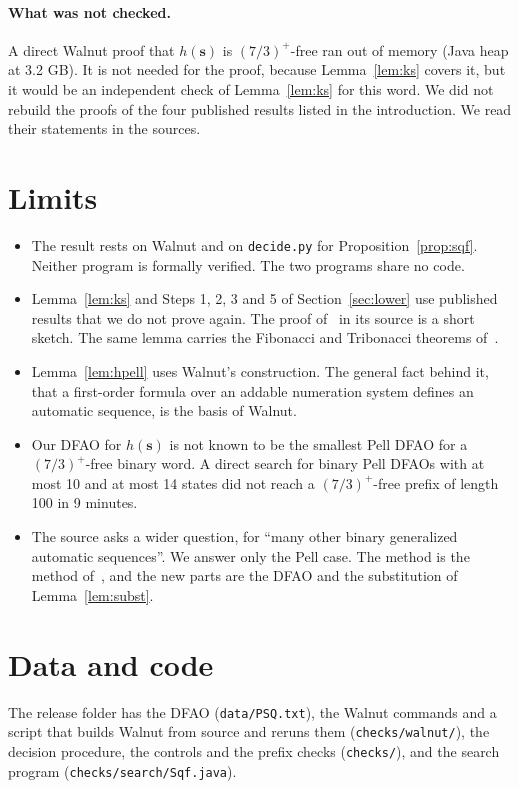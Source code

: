\documentclass[11pt]{article}
\theoremstyle{definition}
\theoremstyle{remark}
\newcommand{\PSQ}{\mathbf{s}}
\begin{document}
\paragraph{What was not checked.} A direct Walnut proof that $h(\PSQ)$ is $(7/3)^+$-free ran out of memory (Java heap at 3.2 GB). It is not needed for the proof, because Lemma~\ref{lem:ks} covers it, but it would be an independent check of Lemma~\ref{lem:ks} for this word. We did not rebuild the proofs of the four published results listed in the introduction. We read their statements in the sources.

\section{Limits}

\begin{itemize}
\item The result rests on Walnut and on \texttt{decide.py} for Proposition~\ref{prop:sqf}. Neither program is formally verified. The two programs share no code.
\item Lemma~\ref{lem:ks} and Steps 1, 2, 3 and 5 of Section~\ref{sec:lower} use published results that we do not prove again. The proof of~\cite[Lemma~10]{ARS} in its source is a short sketch. The same lemma carries the Fibonacci and Tribonacci theorems of~\cite{ARS}.
\item Lemma~\ref{lem:hpell} uses Walnut's construction. The general fact behind it, that a first-order formula over an addable numeration system defines an automatic sequence, is the basis of Walnut.
\item Our DFAO for $h(\PSQ)$ is not known to be the smallest Pell DFAO for a $(7/3)^+$-free binary word. A direct search for binary Pell DFAOs with at most 10 and at most 14 states did not reach a $(7/3)^+$-free prefix of length 100 in 9 minutes.
\item The source asks a wider question, for ``many other binary generalized automatic sequences''. We answer only the Pell case. The method is the method of~\cite{ARS}, and the new parts are the DFAO and the substitution of Lemma~\ref{lem:subst}.
\end{itemize}

\section*{Data and code}
The release folder has the DFAO (\texttt{data/PSQ.txt}), the Walnut commands and a script that builds Walnut from source and reruns them (\texttt{checks/walnut/}), the decision procedure, the controls and the prefix checks (\texttt{checks/}), and the search program (\texttt{checks/search/Sqf.java}).
\end{document}
